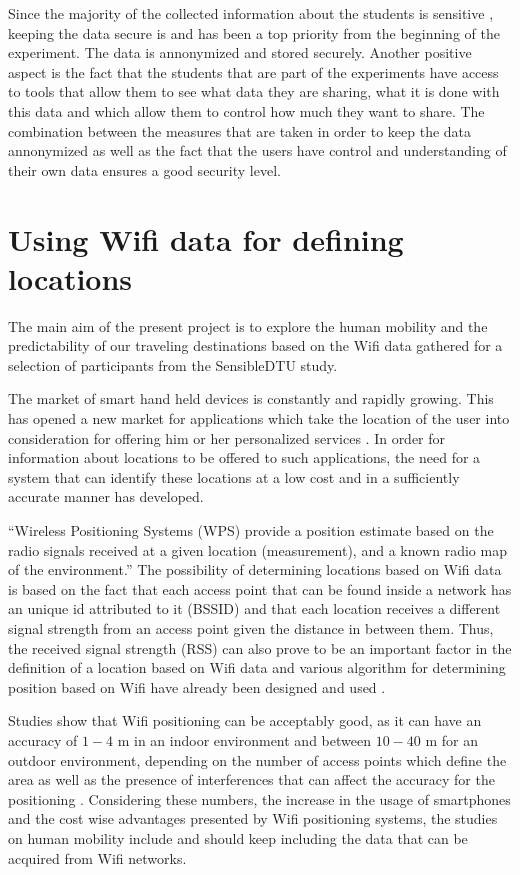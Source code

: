 Since the majority of the collected information about the students is sensitive
\cite{Stopczynski14p}, keeping the data secure is and has been a top priority
from the beginning of the experiment. The data is annonymized and stored
securely. Another positive aspect is the fact that the students that are part of
the experiments have access to tools that allow them to see what data they are
sharing, what it is done with this data and which allow them to control how much
they want to share. The combination between the measures that are taken in order
to keep the data annonymized as well as the fact that the users have control and
understanding of their own data ensures a good security level.


\section{Using Wifi data for defining locations}

The main aim of the present project is to explore the human mobility and the
predictability of our traveling destinations based on the Wifi data gathered for
a selection of participants from the SensibleDTU study.  

The market of smart hand held devices is constantly and rapidly growing. This
has opened a new market for applications which take the location of the user
into consideration for offering him or her personalized services
\cite{alsehly2010improving}. In order for information about locations to be
offered to such applications, the need for a system that can identify these
locations at a low cost and in a sufficiently accurate manner has developed.

``Wireless Positioning Systems (WPS) provide a position estimate based on the
radio signals received at a given location (measurement), and a known radio map
of the environment.''\cite{athanasiou2009utilizing} The possibility of
determining locations based on Wifi data is based on the fact that each access
point that can be found inside a network has an unique id attributed to it
(BSSID) and that each location receives a different signal strength from an
access point given the distance in between them. Thus, the received signal
strength (RSS) can also prove to be an important factor in the definition of a
location based on Wifi data and various algorithm for determining position based
on Wifi have already been designed and used \cite{athanasiou2009utilizing}.

Studies show that Wifi positioning can be acceptably good, as it can have an
accuracy of $1-4$ m in an indoor environment and between $10-40$ m for an
outdoor environment, depending on the number of access points which define the
area as well as the presence of interferences that can affect the accuracy for
the positioning \cite{Cheng:2005:ACM:1067170.1067195} \cite{mok2007location}.
Considering these numbers, the increase in the usage of smartphones and the cost
wise advantages presented by Wifi positioning systems, the studies on human
mobility include and should keep including the data that can be acquired from
Wifi networks.

